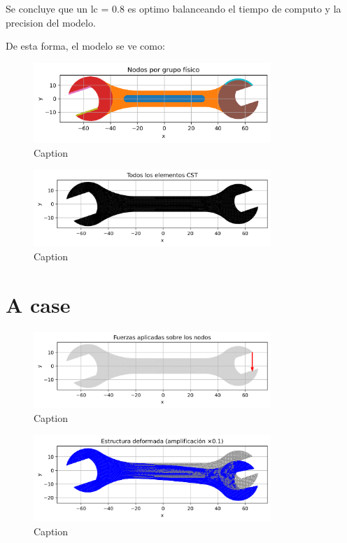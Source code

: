 \documentclass{article}  %
\begin{document}
Se concluye que un lc = 0.8 es optimo balanceando el tiempo de computo y la precision del modelo. 

De esta forma, el modelo se ve como:

\begin{figure}[H]
  \centering
  \includegraphics[width=0.8\textwidth]{GRAFICOS/Case a_nodes_por_grupo.png}
  \caption{Caption}
  \label{fig:wrench}
\end{figure}

\begin{figure}[H]
  \centering
  \includegraphics[width=0.8\textwidth]{GRAFICOS/Case a_elementos.png}
  \caption{Caption}
  \label{fig:deformed_shape}
\end{figure}

\section{A case}

\begin{figure}[H]
  \centering
  \includegraphics[width=0.8\textwidth]{GRAFICOS/Case a_fuerzas.png}
  \caption{Caption}
  \label{fig:strain}
\end{figure}

\begin{figure}[H]
  \centering
  \includegraphics[width=0.8\textwidth]{GRAFICOS/Case a_deformada.png}
  \caption{Caption}
  \label{fig:stress}
\end{figure}
\end{document}

